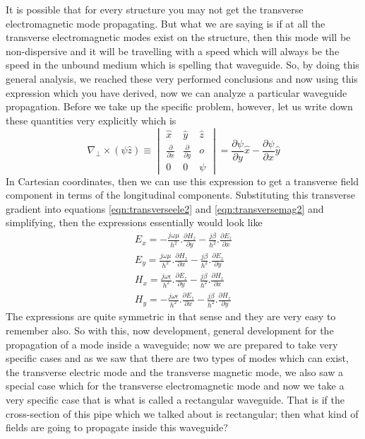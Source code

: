 It is possible that for every structure you may not get the transverse electromagnetic mode propagating. But what we are saying is if at all the transverse electromagnetic modes exist on the structure, then this mode will be non-dispersive and it will be travelling with a speed which will always be the speed in the unbound medium which is spelling that waveguide. So, by doing this general analysis, we reached these very performed conclusions and now using this expression which you have derived, now we can analyze a particular waveguide propagation. Before we take up the specific problem, however, let us write down these quantities very explicitly which is
\begin{dmath*}
\nabla_\bot\times(\psi\hat{z}) \equiv 
\begin{vmatrix}
\hat{x} & \hat{y} &\hat{z}\\
\frac{\partial}{\partial x} & \frac{\partial}{\partial y} & o\\
0 & 0 & \psi
\end{vmatrix} = \frac{\partial\psi}{\partial y}\hat{x} - \frac{\partial\psi}{\partial x}\hat{y}
\end{dmath*}
In Cartesian coordinates, then we can use this expression to get a transverse field component in terms of the longitudinal components. Substituting this transverse gradient into equations \ref{eqn:transverseele2} and \ref{eqn:transversemag2} and simplifying, then the expressions essentially would look like
\begin{align}
E_x = -\frac{j\omega\mu}{h^2}.\frac{\partial H_z}{\partial y} - \frac{j\beta}{h^2}.\frac{\partial E_z}{\partial x}
\label{eqn:transverseex}\\
E_y = \frac{j\omega\mu}{h^2}.\frac{\partial H_z}{\partial x} - \frac{j\beta}{h^2}.\frac{\partial E_z}{\partial y}
\label{eqn:transverseey}\\
H_x = \frac{j\omega\epsilon}{h^2}.\frac{\partial E_z}{\partial y} - \frac{j\beta}{h^2}.\frac{\partial H_z}{\partial x}
\label{eqn:transversehx}\\
H_y = -\frac{j\omega\epsilon}{h^2}.\frac{\partial E_z}{\partial x} - \frac{j\beta}{h^2}.\frac{\partial H_z}{\partial y}
\label{eqn:transversehy}
\end{align}
The expressions are quite symmetric in that sense and they are very easy to remember also. So with this, now development, general development for the propagation of a mode inside a waveguide; now we are prepared to take very specific cases and as we saw that there are two types of modes which can exist, the transverse electric mode and the transverse magnetic mode, we also saw a special case which for the transverse electromagnetic mode and now we take a very specific case that is what is called a rectangular waveguide. That is if the cross-section of this pipe which we talked about is rectangular; then what kind of fields are going to propagate inside this waveguide?